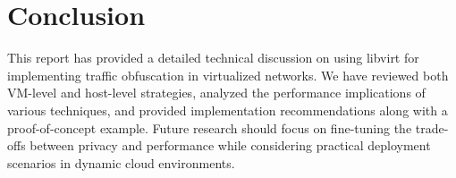 \documentclass{article}
\begin{document}
\section{Conclusion}
This report has provided a detailed technical discussion on using libvirt for implementing traffic obfuscation in virtualized networks. We have reviewed both VM-level and host-level strategies, analyzed the performance implications of various techniques, and provided implementation recommendations along with a proof-of-concept example. Future research should focus on fine-tuning the trade-offs between privacy and performance while considering practical deployment scenarios in dynamic cloud environments.



\end{document}
